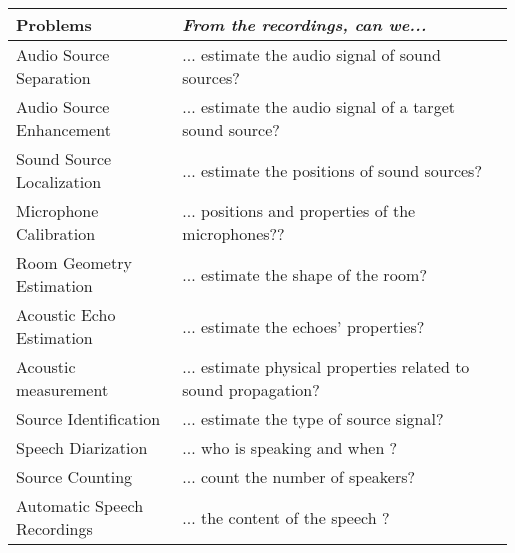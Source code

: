 \begin{tabular}{p{0.33\linewidth} p{0.66\linewidth}}
    \toprule
    Problems & \textit{From the recordings, can we...} \\
    \midrule
    Audio Source Separation   & ... estimate the audio signal of sound sources?\\

    Audio Source Enhancement   & ... estimate the audio signal of a target sound source?\\

    Sound Source Localization & ... estimate the positions of sound sources? \\

    Microphone Calibration    & ... positions and properties of the microphones?? \\

    Room Geometry Estimation  & ... estimate the shape of the room? \\

    Acoustic Echo Estimation  & ... estimate the echoes' properties? \\

    Acoustic measurement      & ... estimate physical properties related to sound propagation?\\

    \hline
    Source Identification     & ... estimate the type of source signal?\\

    Speech Diarization        & ... who is speaking and when ? \\

    Source Counting           & ... count the number of speakers? \\

    Automatic Speech Recordings & ... the content of the speech ? \\

    \bottomrule
\end{tabular}